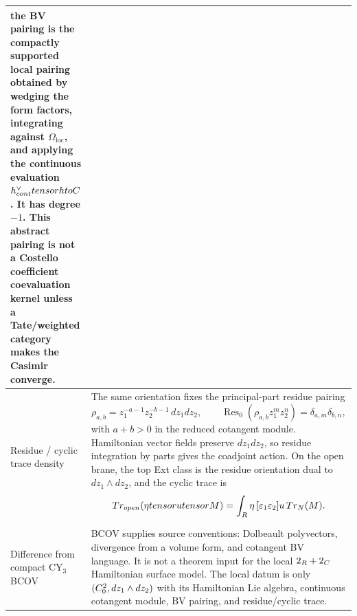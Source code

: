 \begin{longtable}{@{}>{\raggedright\arraybackslash}p{}
  >{\raggedright\arraybackslash}p{}@{}}
\[\]
the BV pairing is the compactly supported local pairing obtained by
wedging the form factors, integrating against
\(\Omega_{\mathrm{loc}}\), and applying the continuous evaluation
\(h^\vee_{cont}tensorhtoC\).  It has
degree \(-1\).  This abstract pairing is not a Costello coefficient
coevaluation kernel unless a Tate/weighted category makes the Casimir
converge.\\
\hline
Residue / cyclic trace density &
The same orientation fixes the principal-part residue pairing
\[
  \rho_{a,b}=z_1^{-a-1}z_2^{-b-1}\,dz_1dz_2,\qquad
  \operatorname{Res}_0(\rho_{a,b}z_1^mz_2^n)
    =\delta_{a,m}\delta_{b,n},
\]
with \(a+b>0\) in the reduced cotangent module.  Hamiltonian vector
fields preserve \(dz_1dz_2\), so residue integration by parts gives the
coadjoint action.  On the open brane, the top Ext class is the residue
orientation dual to \(dz_1\wedge dz_2\), and the cyclic trace is
\[
  Tr_{open}(\eta tensor utensor M)
  =\int_{R}\eta\,[\varepsilon_1\varepsilon_2]u\,
    Tr_N(M).
\]\\
\hline
Difference from compact CY\(_3\) BCOV &
BCOV supplies source conventions: Dolbeault polyvectors, divergence from
a volume form, and cotangent BV language.  It is not a theorem input for
the local \(2_{R}+2_{C}\) Hamiltonian surface model.  The local datum is
only \((C^2_0,dz_1\wedge dz_2)\) with its Hamiltonian Lie
algebra, continuous cotangent module, BV pairing, and residue/cyclic
trace.\\
\hline
\end{longtable}

